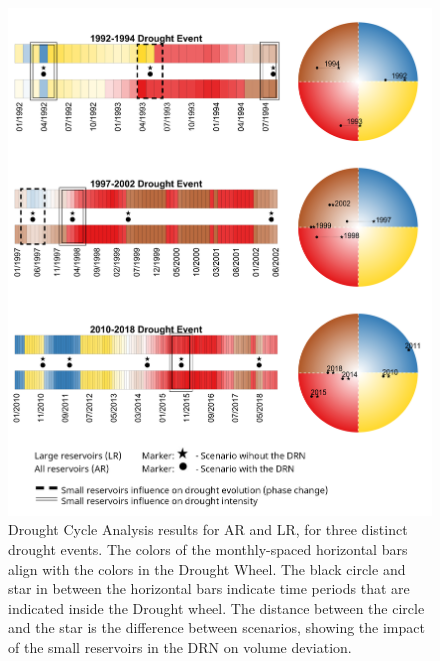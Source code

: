 \documentclass[draft]{agujournal2019}
\begin{document}
\begin{figure}
 \noindent\includegraphics[width=\textwidth]{images/Figure_6.png}
 \caption{Drought Cycle Analysis results for AR and LR, for three distinct drought events. The colors of the monthly-spaced horizontal bars align with the colors in the Drought Wheel. The black circle and star in between the horizontal bars indicate time periods that are indicated inside the Drought wheel. The distance between the circle and the star is the difference between scenarios, showing the impact of the small reservoirs in the DRN on volume deviation.}
 \label{fig7}
\end{figure}
\end{document}
